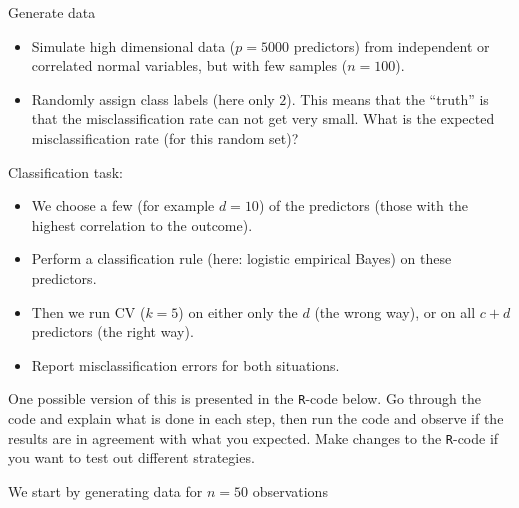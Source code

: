 \documentclass[
]{article}
\providecommand{\tightlist}{%
  \setlength{\itemsep}{0pt}\setlength{\parskip}{0pt}}
\begin{document}
Generate data

\begin{itemize}
\item
  Simulate high dimensional data (\(p = 5000\) predictors) from
  independent or correlated normal variables, but with few samples
  (\(n = 100\)).
\item
  Randomly assign class labels (here only \(2\)). This means that the
  ``truth'' is that the misclassification rate can not get very small.
  What is the expected misclassification rate (for this random set)?
\end{itemize}

Classification task:

\begin{itemize}
\tightlist
\item
  We choose a few (for example \(d = 10\)) of the predictors (those with
  the highest correlation to the outcome).
\item
  Perform a classification rule (here: logistic empirical Bayes) on
  these predictors.
\item
  Then we run CV (\(k = 5\)) on either only the \(d\) (the wrong way),
  or on all \(c + d\) predictors (the right way).
\item
  Report misclassification errors for both situations.
\end{itemize}

One possible version of this is presented in the \texttt{R}-code below.
Go through the code and explain what is done in each step, then run the
code and observe if the results are in agreement with what you expected.
Make changes to the \texttt{R}-code if you want to test out different
strategies.

We start by generating data for \(n=50\) observations
\end{document}
